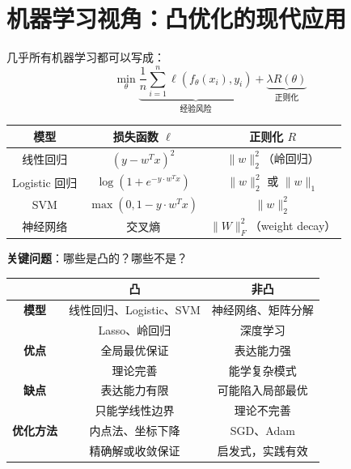 \documentclass[12pt, a4paper]{ctexart}
\begin{document}
\section{机器学习视角：凸优化的现代应用}

\begin{blackboard}[机器学习 = 优化]

几乎所有机器学习都可以写成：
\[
\min_\theta \underbrace{\frac{1}{n} \sum_{i=1}^n \ell(f_\theta(x_i), y_i)}_{\text{经验风险}} + \underbrace{\lambda R(\theta)}_{\text{正则化}}
\]

\begin{center}
\begin{tabular}{c|c|c}
模型 & 损失函数 $\ell$ & 正则化 $R$ \\
\hline
线性回归 & $(y - w^Tx)^2$ & $\|w\|_2^2$（岭回归） \\
Logistic 回归 & $\log(1 + e^{-y \cdot w^Tx})$ & $\|w\|_2^2$ 或 $\|w\|_1$ \\
SVM & $\max(0, 1 - y \cdot w^Tx)$ & $\|w\|_2^2$ \\
神经网络 & 交叉熵 & $\|W\|_F^2$（weight decay）
\end{tabular}
\end{center}

\textbf{关键问题}：哪些是凸的？哪些不是？

\end{blackboard}

\begin{blackboard}[凸 vs 非凸机器学习]

\begin{center}
\begin{tabular}{c|c|c}
& \textbf{凸} & \textbf{非凸} \\
\hline
\textbf{模型} & 线性回归、Logistic、SVM & 神经网络、矩阵分解 \\
& Lasso、岭回归 & 深度学习 \\
\hline
\textbf{优点} & 全局最优保证 & 表达能力强 \\
& 理论完善 & 能学复杂模式 \\
\hline
\textbf{缺点} & 表达能力有限 & 可能陷入局部最优 \\
& 只能学线性边界 & 理论不完善 \\
\hline
\textbf{优化方法} & 内点法、坐标下降 & SGD、Adam \\
& 精确解或收敛保证 & 启发式，实践有效
\end{tabular}
\end{center}

\end{blackboard}
\end{document}
